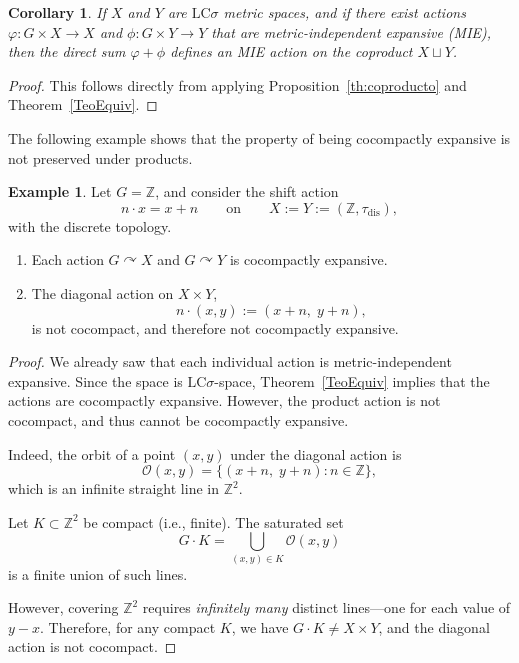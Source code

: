 \documentclass[12pt]{amsart}
\theoremstyle{plain}
\newtheorem{corollary}[theorem]{Corollary}
\theoremstyle{definition}
\newtheorem{example}[theorem]{Example}
\theoremstyle{remark}
\begin{document}
\begin{corollary}
If \( X \) and \( Y \) are $\text{LC}\sigma$ metric spaces, and if there exist actions \( \varphi : G \times X \to X \) and \( \phi : G \times Y \to Y \) that are metric-independent expansive (MIE), then the direct sum \( \varphi + \phi \) defines an MIE action on the coproduct \( X \sqcup Y \).
\end{corollary}

\begin{proof}
This follows directly from applying Proposition~\ref{th:coproducto} and Theorem~\ref{TeoEquiv}.
\end{proof}


\medskip

The following example shows that the property of being cocompactly expansive is not preserved under products.

\begin{example} \label{ex:no-producto}
Let \( G = \mathbb{Z} \), and consider the shift action
\[
  n \cdot x = x + n
  \qquad \text{on} \qquad
  X := Y := (\mathbb{Z}, \tau_{\mathrm{dis}}),
\]
with the discrete topology.

\begin{enumerate}
\item Each action \( G \curvearrowright X \) and \( G \curvearrowright Y \) is cocompactly expansive.
\item The diagonal action on \( X \times Y \),
  \[
  n \cdot (x, y) := (x + n,\; y + n),
  \]
  is not cocompact, and therefore not cocompactly expansive.
\end{enumerate}
\end{example}

\begin{proof}
We already saw that each individual action is metric-independent expansive. Since the space is $\text{LC}\sigma$-space, Theorem~\ref{TeoEquiv} implies that the actions are cocompactly expansive. However, the product action is not cocompact, and thus cannot be cocompactly expansive.

Indeed, the orbit of a point \( (x, y) \) under the diagonal action is
\[
\mathcal{O}(x, y) = \{(x + n,\; y + n) : n \in \mathbb{Z}\},
\]
which is an infinite straight line in \( \mathbb{Z}^2 \).

Let \( K \subset \mathbb{Z}^2 \) be compact (i.e., finite). The saturated set
\[
G \cdot K = \bigcup_{(x, y) \in K} \mathcal{O}(x, y)
\]
is a finite union of such lines.

However, covering \( \mathbb{Z}^2 \) requires \emph{infinitely many} distinct lines—one for each value of \( y - x \). Therefore, for any compact \( K \), we have \( G \cdot K \ne X \times Y \), and the diagonal action is not cocompact.
\end{proof}
\end{document}
